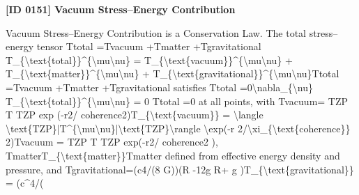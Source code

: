 \clearpage
\noindent\textbf{[ID 0151] Vacuum Stress--Energy Contribution}\par
\vspace{0.35em}
\begingroup\small
{}
Vacuum Stress--Energy Contribution is a Conservation Law. The total stress--energy tensor Ttotal  =Tvacuum  +Tmatter  +Tgravitational  T\_\{\textbackslash{}text\{total\}\}\textasciicircum{}\{\textbackslash{}mu\textbackslash{}nu\} = T\_\{\textbackslash{}text\{vacuum\}\}\textasciicircum{}\{\textbackslash{}mu\textbackslash{}nu\} + T\_\{\textbackslash{}text\{matter\}\}\textasciicircum{}\{\textbackslash{}mu\textbackslash{}nu\} + T\_\{\textbackslash{}text\{gravitational\}\}\textasciicircum{}\{\textbackslash{}mu\textbackslash{}nu\}Ttotal   =Tvacuum   +Tmatter   +Tgravitational   satisfies   Ttotal  =0\textbackslash{}nabla\_\{\textbackslash{}nu\} T\_\{\textbackslash{}text\{total\}\}\textasciicircum{}\{\textbackslash{}mu\textbackslash{}nu\} = 0   Ttotal   =0 at all points, with Tvacuum= TZP T   TZP exp (-r2/ coherence2)T\_\{\textbackslash{}text\{vacuum\}\} = \textbackslash{}langle \textbackslash{}text\{TZP\}|T\textasciicircum{}\{\textbackslash{}mu\textbackslash{}nu\}|\textbackslash{}text\{TZP\}\textbackslash{}rangle \textbackslash{}exp(-r 2/\textbackslash{}xi\_\{\textbackslash{}text\{coherence\}\} 2)Tvacuum = TZP T   TZP exp(-r2/ coherence2 ), TmatterT\_\{\textbackslash{}text\{matter\}\}Tmatter defined from effective energy density and pressure, and Tgravitational=(c4/(8 G))(R  -12g  R+ g  )T\_\{\textbackslash{}text\{gravitational\}\} = (c\textasciicircum{}4/(

